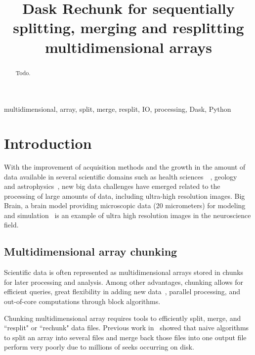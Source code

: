 \documentclass[conference]{IEEEtran}
\begin{document}
\title{ Dask Rechunk for sequentially splitting, merging and resplitting multidimensional arrays }

\author{
}

\maketitle

\begin{abstract}
Todo.
\end{abstract}

\begin{IEEEkeywords}
multidimensional, array, split, merge, resplit, IO, processing, Dask, Python
\end{IEEEkeywords}

\section{Introduction}
With the improvement of acquisition methods and the growth in the amount of data
available in several scientific domains such as health
sciences~\cite{bigdata_health}~\cite{Amunts1472}, geology~\cite{big_data_geology}
and astrophysics~\cite{biguniverse}, new big data challenges have emerged related
to the processing of large amounts of data, including ultra-high resolution
images. Big Brain, a brain model providing microscopic data (20 micrometers) for
modeling and simulation~\cite{Amunts1472} is an example of ultra high resolution
images in the neuroscience field.

\subsection{Multidimensional array chunking}
Scientific data is often represented as multidimensional arrays stored in
chunks for later processing and analysis. Among other advantages, chunking
allows for efficient queries, great flexibility in adding new
data~\cite{optimal_chuking}, parallel processing, and out-of-core
computations through block algorithms.

Chunking multidimensional array requires tools to efficiently split,
merge, and ``resplit" or ``rechunk" data files. Previous work in~\cite{seqalgorithms}
showed that naive algorithms to split an array into several files and merge back
those files into one output file perform very poorly due to millions of seeks
occurring on disk.
\end{document}

